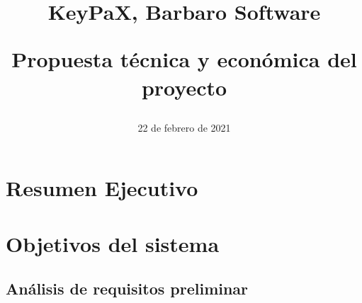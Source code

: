 \documentclass{article}
\title{
\Huge{KeyPaX, Barbaro Software} \\ 
\begin{Large} 
Propuesta técnica y económica    del proyecto
\end{Large}}
\date{22 de febrero de 2021}
\begin{document}
\maketitle

\pagebreak 

\tableofcontents

\pagebreak

\section{Resumen Ejecutivo}


\pagebreak

\section{Objetivos del sistema}



\subsection{Análisis de requisitos preliminar}


\end{document}

